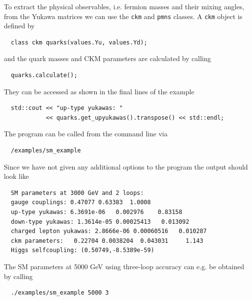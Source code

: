 \documentclass[11pt,a4paper]{article}
\begin{document}
To extract the physical observables, i.e. fermion masses and their mixing angles,  from the Yukawa matrices we can use the \texttt{ckm} and \texttt{pmns} classes. A \texttt{ckm} object is defined by
\begin{lstlisting}
  class ckm quarks(values.Yu, values.Yd);
\end{lstlisting}
and the quark masses and CKM parameters are calculated by calling
\begin{lstlisting}
  quarks.calculate();
\end{lstlisting}
They can be accessed as shown in the final lines of the example
\begin{lstlisting}
  std::cout << "up-type yukawas: "
            << quarks.get_upyukawas().transpose() << std::endl;
\end{lstlisting}
The program can be called from the command line via
\begin{lstlisting}
  /examples/sm_example
\end{lstlisting}
Since we have not given any additional options to the program the output should look like
\begin{lstlisting}
  SM parameters at 3000 GeV and 2 loops:
  gauge couplings: 0.47077 0.63383  1.0008
  up-type yukawas: 6.3691e-06   0.002976    0.83158
  down-type yukawas: 1.3614e-05 0.00025413   0.013092
  charged lepton yukawas: 2.8666e-06 0.00060516   0.010287
  ckm parameters:   0.22704 0.0038204  0.043031     1.143
  Higgs selfcoupling: (0.50749,-8.5389e-59)
\end{lstlisting}
The SM parameters at 5000 GeV using three-loop accuracy can e.g. be obtained by calling
\begin{lstlisting}
  ./examples/sm_example 5000 3
\end{lstlisting}
\end{document}
